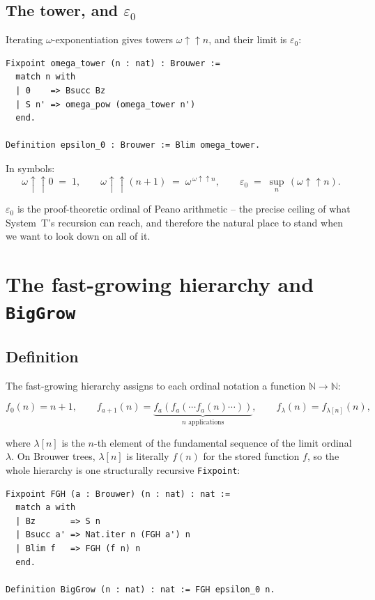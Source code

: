 \documentclass[11pt,a4paper]{article}
\theoremstyle{plain}
\theoremstyle{definition}
\theoremstyle{remark}
\newcommand{\Nat}{\mathbb{N}}
\begin{document}
\subsection{The tower, and $\varepsilon_0$}

Iterating $\omega$-exponentiation gives towers
$\omega \uparrow\uparrow n$, and their limit is $\varepsilon_0$:

\begin{lstlisting}
Fixpoint omega_tower (n : nat) : Brouwer :=
  match n with
  | 0    => Bsucc Bz
  | S n' => omega_pow (omega_tower n')
  end.

Definition epsilon_0 : Brouwer := Blim omega_tower.
\end{lstlisting}

In symbols:
\[
  \omega\!\uparrow\!\uparrow\!0 \;=\; 1,\qquad
  \omega\!\uparrow\!\uparrow\!(n{+}1) \;=\; \omega^{\,\omega\uparrow\uparrow n},\qquad
  \varepsilon_0 \;=\; \sup_n\, (\omega\!\uparrow\!\uparrow\!n).
\]

$\varepsilon_0$ is the proof-theoretic ordinal of Peano arithmetic --
the precise ceiling of what System~T's recursion can reach, and
therefore the natural place to stand when we want to look down on all
of it.

\section{The fast-growing hierarchy and \texttt{BigGrow}}
\label{sec:fgh}

\subsection{Definition}

The fast-growing hierarchy assigns to each ordinal notation a function
$\Nat \to \Nat$:

\[
  f_0(n) = n+1,\qquad
  f_{a+1}(n) = \underbrace{f_a(f_a(\cdots f_a(n)\cdots))}_{n\text{ applications}},\qquad
  f_\lambda(n) = f_{\lambda[n]}(n),
\]

where $\lambda[n]$ is the $n$-th element of the fundamental sequence of
the limit ordinal $\lambda$.  On Brouwer trees, $\lambda[n]$ is
literally $f(n)$ for the stored function $f$, so the whole hierarchy is
one structurally recursive \texttt{Fixpoint}:

\begin{lstlisting}
Fixpoint FGH (a : Brouwer) (n : nat) : nat :=
  match a with
  | Bz       => S n
  | Bsucc a' => Nat.iter n (FGH a') n
  | Blim f   => FGH (f n) n
  end.

Definition BigGrow (n : nat) : nat := FGH epsilon_0 n.
\end{lstlisting}
\end{document}
